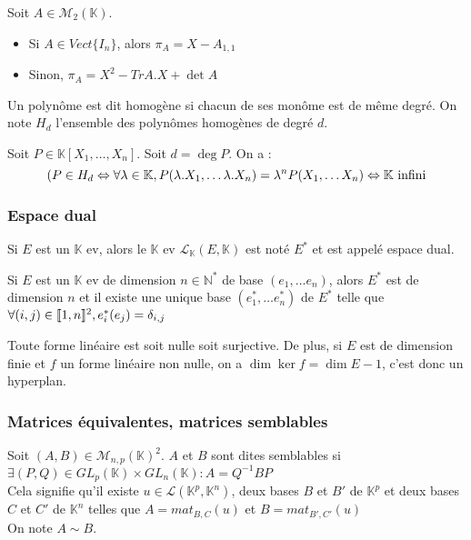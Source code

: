 \begin{prop} Soit $A\in\mathscr{M}_2(\mathbb{K})$. \begin{itemize}
    \item Si $A\in Vect \{I_n\}$, alors $\pi_A = X - A_{1,1}$
    \item Sinon, $\pi_A = X^2 - Tr A.X + \det A$
\end{itemize}\end{prop}

\begin{defi} Un polynôme est dit homogène si chacun de ses monôme est de même degré. On note $H_d$ l'ensemble des polynômes homogènes de degré $d$.
\end{defi}

\begin{prop} Soit $P\in\mathbb{K}[X_1, \ldots, X_n]$. Soit $d=\deg P$. On a :
 \[ \left(P\in H_d \Leftrightarrow \forall \lambda \in \mathbb{K}, P(\lambda.X_1, \ldots \lambda.X_n) = \lambda^nP(X_1,\ldots X_n\right)\Leftrightarrow \mathbb{K} \text{ infini} \]
\end{prop}

\subsubsection{Espace dual}
\begin{defi} Si $E$ est un $\mathbb{K}$ ev, alors le $\mathbb{K}$ ev $\mathscr{L}_\mathbb{K}(E,\mathbb{K})$ est noté $E^*$ et est appelé espace dual.
\end{defi}

\begin{prop}Si $E$ est un $\mathbb{K}$ ev de dimension $n\in\mathbb{N}^*$ de base $(e_1, \ldots e_n)$, alors $E^*$ est de dimension $n$ et il existe une unique base $(e_1^*, \ldots e_n^*)$ de $E^*$ telle que $\forall (i,j)\in\llbracket 1, n \rrbracket^2, e_i^*(e_j) = \delta_{i,j}$
\end{prop}

\begin{prop} Toute forme linéaire est soit nulle soit surjective. De plus, si $E$ est de dimension finie et $f$ un forme linéaire non nulle, on a $\dim\ker f = \dim E - 1$, c'est donc un hyperplan.
\end{prop}

\subsubsection{Matrices équivalentes, matrices semblables}
\begin{defi} Soit $(A,B)\in\mathscr{M}_{n,p}(\mathbb{K})^2$. $A$ et $B$ sont dites semblables si $\exists (P,Q)\in GL_p(\mathbb{K})\times GL_n(\mathbb{K}): A=Q^{-1}BP$ \\
    Cela signifie qu'il existe $u\in\mathscr{L}(\mathbb{K}^p,\mathbb{K}^n)$, deux bases $B$ et $B'$ de $\mathbb{K}^p$ et deux bases $C$ et $C'$ de $\mathbb{K}^n$ telles que $A=mat_{B,C}(u)$ et $B=mat_{B',C'}(u)$ \\
    On note $A\sim B$.
\end{defi}

